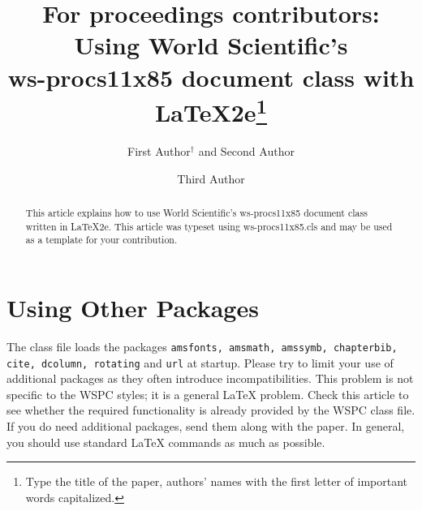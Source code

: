 \documentclass{ws-procs11x85}
\begin{document}
\title{For proceedings contributors: Using World Scientific's\\ ws-procs11x85 document class with \LaTeX2e\footnote{Type the title of the paper, authors' names with the first letter of important words capitalized.}}

\author{First Author$^\dag$ and Second Author}

\address{University Department, University Name,\\
City, State ZIP/Zone, Country\\
$^\dag$E-mail: ab\_author@university.com\\
www.university\_name.edu}

\author{Third Author}

\address{Group, Laboratory, Street,\\
City, State ZIP/Zone, Country\\
E-mail: an\_author@laboratory.com}

\begin{abstract}
This article explains how to use World Scientific's ws-procs11x85
document class written in \LaTeX2e. This article was typeset using
ws-procs11x85.cls and may be used as a template for your contribution.
\end{abstract}



\bodymatter

\section{Using Other Packages}\label{aba:sec1}
The class file loads the packages {\tt amsfonts, amsmath, amssymb,
chapterbib, cite, dcolumn, rotating} and {\tt url} at
startup. Please try to limit your use of additional packages as they
often introduce incompatibilities. This problem is not specific to
the WSPC styles; it is a general \LaTeX{} problem. Check this
article to see whether the required functionality is already
provided by the WSPC class file. If you do need additional packages,
send them along with the paper. In general, you should use standard
\LaTeX{} commands as much as possible.
\end{document}

